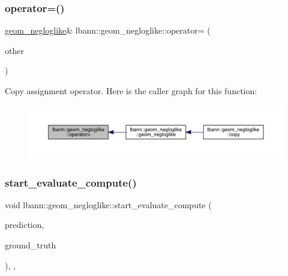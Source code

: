 \subsubsection{\texorpdfstring{operator=()}{operator=()}}
{\footnotesize\ttfamily \hyperlink{classlbann_1_1geom__negloglike}{geom\+\_\+negloglike}\& lbann\+::geom\+\_\+negloglike\+::operator= (\begin{DoxyParamCaption}\item[{const \hyperlink{classlbann_1_1geom__negloglike}{geom\+\_\+negloglike} \&}]{other }\end{DoxyParamCaption})\hspace{0.3cm}{\ttfamily [default]}}

Copy assignment operator. Here is the caller graph for this function\+:\nopagebreak
\begin{figure}[H]
\begin{center}
\leavevmode
\includegraphics[width=350pt]{classlbann_1_1geom__negloglike_afc2a0cfef07468bd9ed628b734fbc5da_icgraph}
\end{center}
\end{figure}
\mbox{\label{classlbann_1_1geom__negloglike_ae17106630ad2f85df0dbd528bfbbea7d}} 
\subsubsection{\texorpdfstring{start\+\_\+evaluate\+\_\+compute()}{start\_evaluate\_compute()}}
{\footnotesize\ttfamily void lbann\+::geom\+\_\+negloglike\+::start\+\_\+evaluate\+\_\+compute (\begin{DoxyParamCaption}\item[{const \hyperlink{base_8hpp_a9a697a504ae84010e7439ffec862b470}{Abs\+Dist\+Mat} \&}]{prediction,  }\item[{const \hyperlink{base_8hpp_a9a697a504ae84010e7439ffec862b470}{Abs\+Dist\+Mat} \&}]{ground\+\_\+truth }\end{DoxyParamCaption})\hspace{0.3cm}{\ttfamily [inline]}, {\ttfamily [override]}, {\ttfamily [virtual]}}

